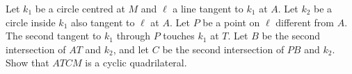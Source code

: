 Let $k_1$ be a circle centred at $M$ and $\ell$ a line tangent to $k_1$ at $A$.
Let $k_2$ be a circle inside $k_1$ also tangent to $\ell$ at $A$.
Let $P$ be a point on $\ell$ different from $A$.
The second tangent to $k_1$ through $P$ touches $k_1$ at $T$.
Let $B$ be the second intersection of $AT$ and $k_2$, and let $C$ be the second intersection of $PB$ and $k_2$.
Show that $ATCM$ is a cyclic quadrilateral.
